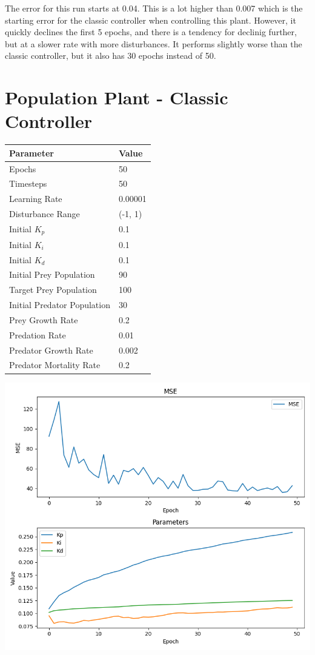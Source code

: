 \documentclass[12pt]{article}
\begin{document}
The error for this run starts at 0.04. This is a lot higher than 0.007 which is the starting error for the classic
controller when controlling this plant. However, it quickly declines the first 5 epochs, and there is a tendency for declinig
further, but at a slower rate with more disturbances. It performs slightly worse than the classic controller, but it also has
30 epochs instead of 50.

\section*{Population Plant - Classic Controller}

\begin{tabular}{|l|l|}
    \hline
    \textbf{Parameter}   & \textbf{Value}\\ \hline
    Epochs               & 50            \\ \hline
    Timesteps            & 50            \\ \hline
    Learning Rate        & 0.00001          \\ \hline
    Disturbance Range    & (-1, 1) \\ \hline
    Initial $K_p$           & 0.1           \\ \hline
    Initial $K_i$           & 0.1           \\ \hline
    Initial $K_d$           & 0.1           \\ \hline
    Initial Prey Population                    & 90            \\ \hline
    Target Prey Population & 100             \\ \hline
    Initial Predator Population                    & 30           \\ \hline
    Prey Growth Rate & 0.2             \\ \hline
    Predation Rate & 0.01             \\ \hline
    Predator Growth Rate & 0.002             \\ \hline
    Predator Mortality Rate & 0.2             \\ \hline
\end{tabular}

\begin{center}
    \includegraphics[width=0.8\linewidth]{figures/population-classic.png}
\end{center}
\end{document}
